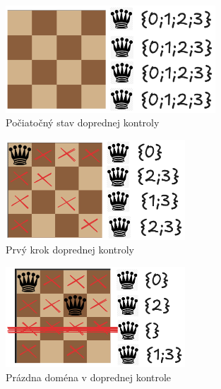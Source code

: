 \begin{figure}
    \centering
    \includegraphics[width=0.7\textwidth]{figs/forward-checking/forward-checking-zero-step}
    \caption{Počiatočný stav doprednej kontroly}
    \label{fig:forward-checking-zero-step}
\end{figure}
\begin{figure}
    \centering
    \includegraphics[width=0.6\textwidth]{figs/forward-checking/forward-checking-first-step}
    \caption{Prvý krok doprednej kontroly}
    \label{fig:forward-checking-first-step}
\end{figure}
\begin{figure}
    \centering
    \includegraphics[width=0.6\textwidth]{figs/forward-checking/forward-checking-empty-domain}
    \caption{Prázdna doména v doprednej kontrole}
    \label{fig:forward-checking-empty-domain}
\end{figure}

